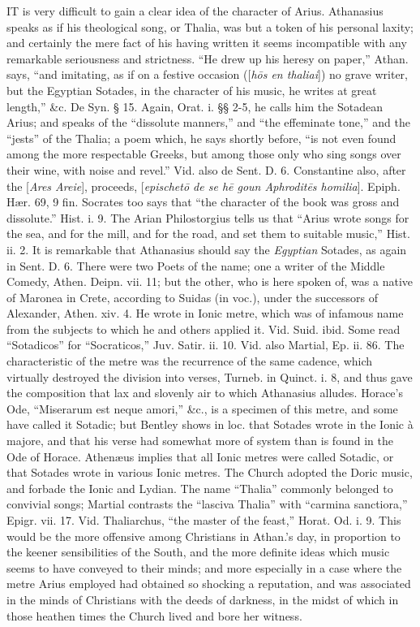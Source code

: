 IT is very
difficult to gain a clear idea of the character of Arius. Athanasius
speaks as if his theological song, or Thalia, was but a token of his
personal laxity; and certainly the mere fact of his having written it
seems incompatible with any remarkable seriousness and strictness. ``He
drew up his heresy on paper,'' Athan. says, ``and imitating, as if on a
festive occasion ([\emph{h\={o}s en thaliai}]) no grave writer, but
the Egyptian Sotades, in the character of his music, he writes at
great length,'' \&c. De Syn. § 15. Again, Orat. i. §§ 2-5, he
calls him the Sotadean Arius; and speaks of the ``dissolute manners,''
and ``the effeminate tone,'' and the ``jests'' of the Thalia; a poem
which, he says shortly before, ``is not even found among the more
respectable Greeks, but among those only who sing songs over their
wine, with noise and revel.'' Vid. also de Sent. D. 6. Constantine
also, after the [\emph{Ares Areie}], proceeds, [\emph{epischet\={o} de
se h\={e} goun Aphrodit\={e}s homilia}]. Epiph. Hær. 69, 9
fin. Socrates too says that ``the character of the book was gross and
dissolute.'' Hist. i. 9. The Arian Philostorgius tells us that ``Arius
wrote songs for the sea, and for the mill, and for the road, and set
them to suitable music,'' Hist. ii. 2. It is remarkable that Athanasius
should say the \emph{Egyptian} Sotades, as again in Sent. D. 6. There
were two Poets of the name; one a writer of the Middle Comedy,
Athen. Deipn. vii. 11; but the other, who is here spoken of, was a
native of Maronea in Crete, according to Suidas (in voc.), under the
successors of Alexander, Athen. xiv. 4. He wrote in Ionic metre, which
was of infamous name from the subjects to which he and others applied
it. Vid. Suid. ibid. Some read ``Sotadicos'' for ``Socraticos,'' Juv.
Satir. ii. 10. Vid. also Martial, Ep. ii. 86. The characteristic of
the metre was the recurrence of the same cadence, which virtually
destroyed the division into verses, Turneb. in Quinct. i. 8, and thus
gave the composition that lax and slovenly air to which Athanasius
alludes. Horace's Ode, ``Miserarum est neque amori,'' \&c., is a
specimen of this metre, and some have called it Sotadic; but Bentley
shows in loc. that Sotades wrote in the Ionic à majore, and that his
verse had somewhat more of system than is found in the Ode of Horace.
Athenæus implies that all Ionic metres were called Sotadic, or that
Sotades wrote in various Ionic metres. The Church adopted the Doric
music, and forbade the Ionic and Lydian. The name ``Thalia'' commonly
belonged to convivial songs; Martial contrasts the ``lasciva Thalia''
with ``carmina sanctiora,'' Epigr. vii. 17. Vid. Thaliarchus, ``the
master of the feast,'' Horat. Od. i. 9. This would be the more
offensive among Christians in Athan.'s day, in proportion to the
keener sensibilities of the South, and the more definite ideas which
music seems to have conveyed to their minds; and more especially in a
case where the metre Arius employed had obtained so shocking a
reputation, and was associated in the minds of Christians with
the deeds of darkness, in the midst of which in those heathen times
the Church lived and bore her witness.

